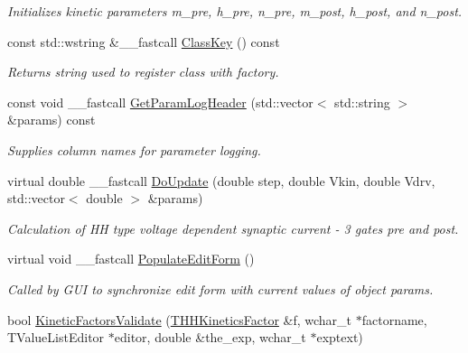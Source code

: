 \begin{DoxyCompactItemize}
\begin{DoxyCompactList}\small\item\em Initializes kinetic parameters m\+\_\+pre, h\+\_\+pre, n\+\_\+pre, m\+\_\+post, h\+\_\+post, and n\+\_\+post. \end{DoxyCompactList}\item 
const std\+::wstring \&\+\_\+\+\_\+fastcall \hyperlink{class_t_h_h2_current_aede58e5114cd7b8284430badd4c29f3e}{Class\+Key} () const 
\begin{DoxyCompactList}\small\item\em Returns string used to register class with factory. \end{DoxyCompactList}\item 
const void \+\_\+\+\_\+fastcall \hyperlink{class_t_h_h2_current_a3c372c52efdd52caff8dec2387e2378b}{Get\+Param\+Log\+Header} (std\+::vector$<$ std\+::string $>$ \&params) const 
\begin{DoxyCompactList}\small\item\em Supplies column names for parameter logging. \end{DoxyCompactList}\item 
virtual double \+\_\+\+\_\+fastcall \hyperlink{class_t_h_h2_current_a7c7b9b8ce1ce38565abc9caca3d65ab3}{Do\+Update} (double step, double Vkin, double Vdrv, std\+::vector$<$ double $>$ \&params)
\begin{DoxyCompactList}\small\item\em Calculation of H\+H type voltage dependent synaptic current -\/ 3 gates pre and post. \end{DoxyCompactList}\item 
\hypertarget{class_t_h_h2_current_a7434ced3846a8438ab5590a240a6414b}{virtual void \+\_\+\+\_\+fastcall \hyperlink{class_t_h_h2_current_a7434ced3846a8438ab5590a240a6414b}{Populate\+Edit\+Form} ()}\label{class_t_h_h2_current_a7434ced3846a8438ab5590a240a6414b}

\begin{DoxyCompactList}\small\item\em Called by G\+U\+I to synchronize edit form with current values of object params. \end{DoxyCompactList}\item 
\hypertarget{class_t_h_h2_current_aec6192de15f06600102651831fc50676}{bool \hyperlink{class_t_h_h2_current_aec6192de15f06600102651831fc50676}{Kinetic\+Factors\+Validate} (\hyperlink{class_t_h_h_kinetics_factor}{T\+H\+H\+Kinetics\+Factor} \&f, wchar\+\_\+t $\ast$factorname, T\+Value\+List\+Editor $\ast$editor, double \&the\+\_\+exp, wchar\+\_\+t $\ast$exptext)}\label{class_t_h_h2_current_aec6192de15f06600102651831fc50676}


\end{DoxyCompactItemize}
